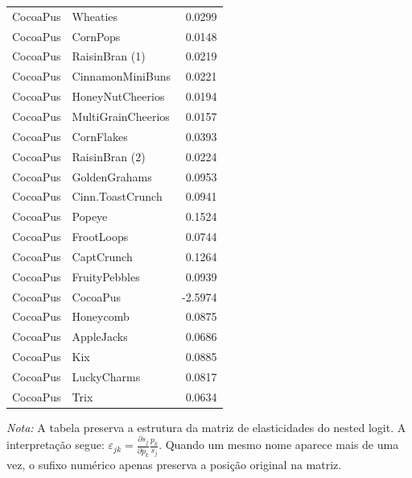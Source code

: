 \begin{table}[H]
\begin{tabular}{llr}
CocoaPus & Wheaties & 0.0299 \\
CocoaPus & CornPops & 0.0148 \\
CocoaPus & RaisinBran (1) & 0.0219 \\
CocoaPus & CinnamonMiniBuns & 0.0221 \\
CocoaPus & HoneyNutCheerios & 0.0194 \\
CocoaPus & MultiGrainCheerios & 0.0157 \\
CocoaPus & CornFlakes & 0.0393 \\
CocoaPus & RaisinBran (2) & 0.0224 \\
CocoaPus & GoldenGrahams & 0.0953 \\
CocoaPus & Cinn.ToastCrunch & 0.0941 \\
CocoaPus & Popeye & 0.1524 \\
CocoaPus & FrootLoops & 0.0744 \\
CocoaPus & CaptCrunch & 0.1264 \\
CocoaPus & FruityPebbles & 0.0939 \\
CocoaPus & CocoaPus & -2.5974 \\
CocoaPus & Honeycomb & 0.0875 \\
CocoaPus & AppleJacks & 0.0686 \\
CocoaPus & Kix & 0.0885 \\
CocoaPus & LuckyCharms & 0.0817 \\
CocoaPus & Trix & 0.0634 \\
\bottomrule
\end{tabular}

\vspace{0.3em}
\footnotesize
\textit{Nota:} A tabela preserva a estrutura da matriz de elasticidades do nested logit. A interpretação segue: $\varepsilon_{jk}=\frac{\partial s_j}{\partial p_k}\frac{p_k}{s_j}$. Quando um mesmo nome aparece mais de uma vez, o sufixo numérico apenas preserva a posição original na matriz.
\end{table}
\endgroup


